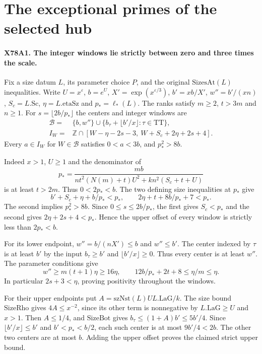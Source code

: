 \section{The exceptional primes of the selected hub}

\paragraph{X78A1. The integer windows lie strictly between zero and three times the scale.}
Fix a size datum $L$, its parameter choice $P$, and the original
$\mathrm{SizesAt}(L)$ inequalities. Write $U=x^\varepsilon$,
$b=e^U$, $X'=\exp(x^{\varepsilon/3})$, $b'=xb/X'$,
$w''=b'/(xn)$, $S_c=L.\mathrm{Sc}$, $\eta=L.\mathrm{etaSz}$ and
$p_*=\ell_*(L)$. The ranks satisfy $m\ge2$, $t>3m$ and $n\ge1$.
For $s=\lfloor 2b/p_*\rfloor$ the centers and integer windows are
\[
 \begin{aligned}
 \mathcal B={}&\{b,w''\}\cup
    \{b_\tau+\lfloor b'/x\rfloor:\tau\in\mathrm{TT}\},\\
 I_W={}&\mathbb Z\cap
 [W-\eta-2s-3,\ W+S_c+2\eta+2s+4].
 \end{aligned}
\]
Every $a\in I_W$ for $W\in\mathcal B$ satisfies $0<a<3b$,
and $p_*^2>8b$.

Indeed $x>1$, $U\ge1$ and the denominator of
\[
 p_*=\frac{mb}{nt^2(N(m)+t)U^2+kn^2(S_c+t+U)}
\]
is at least $t>2m$. Thus $0<2p_*<b$. The two defining size
inequalities at $p_*$ give
\[
 b'+S_c+\eta+b/p_*<p_*,
 \qquad 2\eta+t+8b/p_*+7<p_* .
\]
The second implies $p_*^2>8b$. Since $0\le s\le 2b/p_*$,
the first gives $S_c<p_*$ and the second gives
$2\eta+2s+4<p_*$. Hence the upper offset of every window is
strictly less than $2p_*<b$.

For its lower endpoint, $w''=b/(nX')\le b$ and $w''\le b'$.
The center indexed by $\tau$ is at least $b'$ by the input
$b_\tau\ge b'$ and $\lfloor b'/x\rfloor\ge0$. Thus every
center is at least $w''$. The parameter conditions give
\[
 w''\ge m(t+1)\eta\ge16\eta,\qquad
 12b/p_*+2t+8\le\eta/m\le\eta.
\]
In particular $2s+3<\eta$, proving positivity throughout the windows.

For their upper endpoints put $A=\mathrm{szNst}(L)U L.\mathrm{LaG}/k$.
The size bound $\mathrm{SizeRho}$ gives $4A\le x^{-2}$, since
its other term is nonnegative by $L.\mathrm{LaG}\ge U$ and $x>1$.
Then $A\le1/4$, and $\mathrm{SizeBot}$ gives
$b_\tau\le (1+A)b'\le5b'/4$. Since $\lfloor b'/x\rfloor\le b'$
and $b'<p_*<b/2$, each such center is at most $9b'/4<2b$.
The other two centers are at most $b$. Adding the upper offset
proves the claimed strict upper bound.

